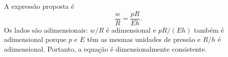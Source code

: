 A expressão proposta é
\[
\frac{w}{R} = \frac{pR}{Eh}.
\]
Os lados são adimensionais: $w/R$ é adimensional e $pR/(Eh)$ também é adimensional porque $p$ e $E$ têm as mesmas unidades de pressão e $R/h$ é adimensional. Portanto, a equação é dimensionalmente consistente. 